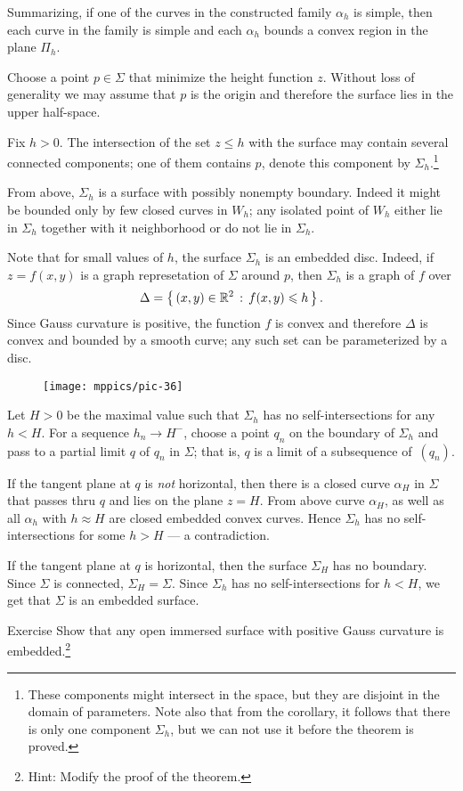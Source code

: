 Summarizing, if one of the curves in the constructed family $\alpha_{h}$ is simple,
then each curve in the family is simple and each $\alpha_{h}$ bounds a convex region in the plane $\Pi_h$. 

Choose a point $p\in \Sigma$ that minimize the height function $z$.
Without loss of generality we may assume that $p$ is the origin and therefore the surface lies in the upper half-space.

Fix $h>0$.
The intersection of the set $z\le h$ with the surface may contain several connected components;
one of them contains $p$, denote this component by $\Sigma_h$.\footnote{These components might intersect in the space, but they are disjoint in the domain of parameters. Note also that from the corollary, it follows that there is only one component $\Sigma_h$, but we can not use it before the theorem is proved.}


From above, $\Sigma_h$ is a surface with possibly nonempty boundary.
Indeed it might be bounded only by few closed curves in $W_h$;
any isolated point of $W_h$ either lie in $\Sigma_h$ together with it neighborhood or do not lie in $\Sigma_h$.


Note that for small values of $h$, the surface $\Sigma_h$ is an embedded disc.
Indeed, if $z=f(x,y)$ is a graph represetation of $\Sigma$ around $p$,
then $\Sigma_h$ is a graph of $f$ over 
\[\Delta=\left\{\,{(x,y)\in\mathbb{R}^2}\,:\,{f(x,y)\leqslant h}\,\right\}.\]
Since Gauss curvature is positive, the function $f$ is convex and therefore $\Delta$ is convex and bounded by a smooth curve;
any such set can be parameterized by a disc.

\begin{wrapfigure}{r}{30 mm}
\vskip-0mm
\centering
\texttt{[image: mppics/pic-36]}
\vskip-0mm
\end{wrapfigure}

Let $H>0$ be the maximal value such that $\Sigma_h$ has no self-intersections for any $h<H$.
For a sequence $h_n\to H^-$, choose a point $q_n$ on the boundary of $\Sigma_h$ and pass to a partial limit $q$ of $q_n$ in $\Sigma$;
that is, $q$ is a limit of a subsequence of~$(q_n)$.

If the tangent plane at $q$ is \emph{not} horizontal, 
then there is a closed curve $\alpha_H$ in $\Sigma$ that passes thru $q$ and lies on the plane $z=H$.
From above curve $\alpha_H$, as well as all $\alpha_h$ with $h\approx H$ are closed embedded convex curves.
Hence $\Sigma_h$ has no self-intersections for some $h>H$ --- a contradiction.

If the tangent plane at $q$ is horizontal,
then the surface $\Sigma_H$ has no boundary.
Since $\Sigma$ is connected, $\Sigma_H=\Sigma$.
Since $\Sigma_h$ has no self-intersections for $h<H$, we get that $\Sigma$ is an embedded surface.
\qeds

\begin{thm}{Exercise}
Show that any open immersed surface with positive Gauss curvature is embedded.\footnote{Hint: Modify the proof of the theorem.}
\end{thm}

